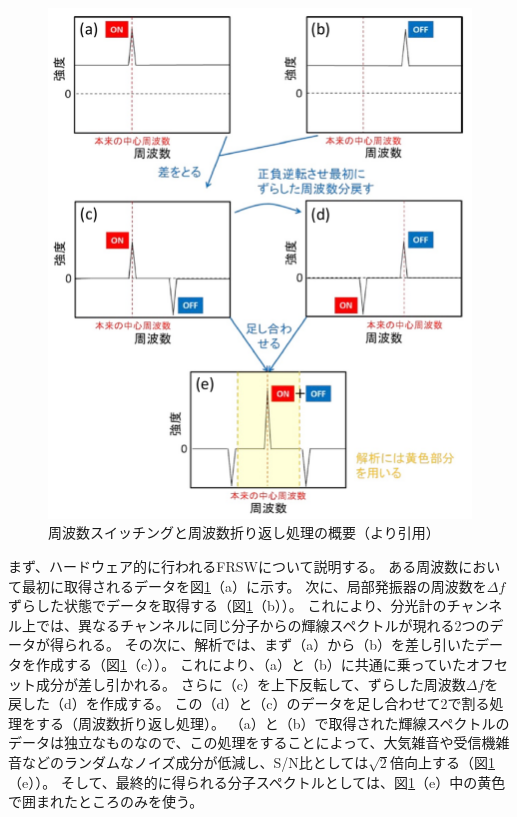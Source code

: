 \begin{figure}[htbp]
    \centering
    \includegraphics[width=\linewidth]{master_thesis_contents/master_thesis_fig/frsw_process.pdf}
    \caption{周波数スイッチングと周波数折り返し処理の概要（\cite{ito2017master}より引用）}
    \label{fig:frsw_process}
\end{figure}
まず、ハードウェア的に行われるFRSWについて説明する。
ある周波数において最初に取得されるデータを図\ref{fig:frsw_process}（a）に示す。
次に、局部発振器の周波数を$\Delta f$ずらした状態でデータを取得する（図\ref{fig:frsw_process}（b））。
これにより、分光計のチャンネル上では、異なるチャンネルに同じ分子からの輝線スペクトルが現れる2つのデータが得られる。
その次に、解析では、まず（a）から（b）を差し引いたデータを作成する（図\ref{fig:frsw_process}（c））。
これにより、（a）と（b）に共通に乗っていたオフセット成分が差し引かれる。
さらに（c）を上下反転して、ずらした周波数$\Delta f$を戻した（d）を作成する。
この（d）と（c）のデータを足し合わせて2で割る処理をする（周波数折り返し処理）。
（a）と（b）で取得された輝線スペクトルのデータは独立なものなので、この処理をすることによって、大気雑音や受信機雑音などのランダムなノイズ成分が低減し、S/N比としては$\sqrt{2}$倍向上する（図\ref{fig:frsw_process}（e））。
そして、最終的に得られる分子スペクトルとしては、図\ref{fig:frsw_process}（e）中の黄色で囲まれたところのみを使う。
\clearpage


